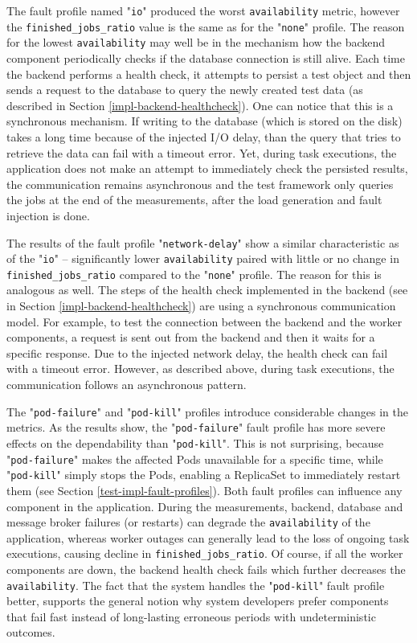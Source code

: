 The fault profile named "\texttt{io}" produced the worst \texttt{availability} metric, however the \texttt{finished\_jobs\_ratio} value is the same as for the "\texttt{none}" profile. The reason for the lowest \texttt{availability} may well be in the mechanism how the backend component periodically checks if the database connection is still alive. Each time the backend performs a health check, it attempts to persist a test object and then sends a request to the database to query the newly created test data (as described in Section \ref{impl-backend-healthcheck}). One can notice that this is a synchronous mechanism. If writing to the database (which is stored on the disk) takes a long time because of the injected I/O delay, than the query that tries to retrieve the data can fail with a timeout error. Yet, during task executions, the application does not make an attempt to immediately check the persisted results, the communication remains asynchronous and the test framework only queries the jobs at the end of the measurements, after the load generation and fault injection is done.

The results of the fault profile "\texttt{network-delay}" show a similar characteristic as of the "\texttt{io}" -- significantly lower \texttt{availability} paired with little or no change in \texttt{finished\_jobs\_ratio} compared to the "\texttt{none}" profile. The reason for this is analogous as well. The steps of the health check implemented in the backend (see in Section \ref{impl-backend-healthcheck}) are using a synchronous communication model. For example, to test the connection between the backend and the worker components, a request is sent out from the backend and then it waits for a specific response. Due to the injected network delay, the health check can fail with a timeout error. However, as described above, during task executions, the communication follows an asynchronous pattern.

The "\texttt{pod-failure}" and "\texttt{pod-kill}" profiles introduce considerable changes in the metrics. As the results show, the "\texttt{pod-failure}" fault profile has more severe effects on the dependability than "\texttt{pod-kill}". This is not surprising, because "\texttt{pod-failure}" makes the affected Pods unavailable for a specific time, while "\texttt{pod-kill}" simply stops the Pods, enabling a ReplicaSet to immediately restart them (see Section \ref{test-impl-fault-profiles}). Both fault profiles can influence any component in the application. During the measurements, backend, database and message broker failures (or restarts) can degrade the \texttt{availability} of the application, whereas worker outages can generally lead to the loss of ongoing task executions, causing decline in \texttt{finished\_jobs\_ratio}. Of course, if all the worker components are down, the backend health check fails which further decreases the \texttt{availability}. The fact that the system handles the "\texttt{pod-kill}" fault profile better, supports the general notion why system developers prefer components that fail fast instead of long-lasting erroneous periods with undeterministic outcomes.

